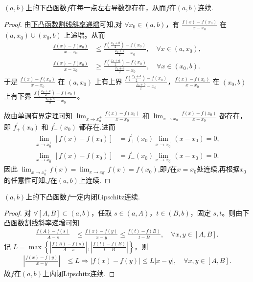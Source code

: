 \documentclass[../../main.tex]{subfiles}
\begin{document}
\begin{theorem}[开区间下凸函数左右导数处处存在]\label{theorem:开区间下凸函数左右导数处处存在}
\((a,b)\)上的下凸函数\(f\)在每一点左右导数都存在，从而\(f\)在\((a,b)\)连续.
\end{theorem}
\begin{proof}
由\hyperref[下凸函数割线斜率递增]{下凸函数割线斜率递增}可知,对 $\forall x_0\in (a,b)$，有 $\frac{f(x) - f(x_0)}{x - x_0}$ 在 $(a,x_0) \cup (x_0,b)$ 上递增。从而
\begin{align*}
\frac{f(x) - f(x_0)}{x - x_0} &\leqslant \frac{f\left(\frac{x_0 + b}{2}\right) - f(x_0)}{\frac{x_0 + b}{2} - x_0}, \quad \forall x\in (a,x_0), \\
\frac{f(x) - f(x_0)}{x - x_0} &\geqslant \frac{f\left(\frac{x_0 + a}{2}\right) - f(x_0)}{\frac{x_0 + a}{2} - x_0}, \quad \forall x\in (x_0,b).
\end{align*}
于是 $\frac{f(x) - f(x_0)}{x - x_0}$ 在 $(a,x_0)$ 上有上界 $\frac{f\left(\frac{x_0 + b}{2}\right) - f(x_0)}{\frac{x_0 + b}{2} - x_0}$，$\frac{f(x) - f(x_0)}{x - x_0}$ 在 $(x_0,b)$ 上有下界 $\frac{f\left(\frac{x_0 + a}{2}\right) - f(x_0)}{\frac{x_0 + a}{2} - x_0}$。

故由单调有界定理可知 $\lim_{x \to x_0^+} \frac{f(x) - f(x_0)}{x - x_0}$ 和 $\lim_{x \to x_0^-} \frac{f(x) - f(x_0)}{x - x_0}$ 都存在，即 $f_{+}^{\prime}(x_0)$ 和 $f_{-}^{\prime}(x_0)$ 都存在.进而
\begin{align*}
\lim_{x \to x_0^+} [f(x) - f(x_0)] &=f_{+}^{\prime}(x_0) \lim_{x \to x_0^+} (x - x_0) = 0, \\
\lim_{x \to x_0^-} [f(x) - f(x_0)] &=f_{-}^{\prime}(x_0) \lim_{x \to x_0^-} (x - x_0) = 0.
\end{align*}
因此 $\lim_{x \to x_0^+} f(x) = \lim_{x \to x_0^-} f(x) = f(x_0)$,即$f$在$x=x_0$处连续,再根据$x_0$的任意性可知,$f$在$(a,b)$上连续.
\end{proof}


\begin{theorem}[开区间上的下凸函数内闭Lipschitz连续]\label{theorem:开区间上的下凸函数一定内闭Lipschitz连续}
\((a,b)\)上的下凸函数\(f\)一定内闭Lipschitz连续.
\end{theorem}
\begin{proof}
对 $\forall [A,B] \subset (a,b)$，任取 $s\in (a,A)$，$t\in (B,b)$，固定 $s,t$。则由下凸函数割线斜率递增可知
\begin{align*}
\frac{f(A) - f(s)}{A - s} &\leqslant \frac{f(x) - f(y)}{x - y} \leqslant \frac{f(t) - f(B)}{t - B}, \quad \forall x,y\in [A,B].
\end{align*}
记 $L = \max\left\{\left|\frac{f(A) - f(s)}{A - s}\right|, \left|\frac{f(t) - f(B)}{t - B}\right|\right\}$，则
\begin{align*}
\left|\frac{f(x) - f(y)}{x - y}\right| &\leqslant L \Rightarrow \left|f(x) - f(y)\right| \leqslant L\left|x - y\right|, \quad \forall x,y\in [A,B].
\end{align*}
故\(f\)在$(a,b)$上内闭Lipschitz连续.
\end{proof}
\end{document}
